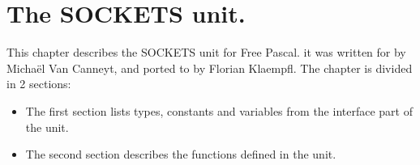 %
%
%
%
%
\chapter{The SOCKETS unit.}
This chapter describes the SOCKETS unit for Free Pascal. 
it was written for \linux by Micha\"el Van Canneyt, and ported to \windows
by Florian Klaempfl.
The chapter is divided in 2 sections:
\begin{itemize}
\item The first section lists types, constants and variables from the
interface part of the unit.
\item The second section describes the functions defined in the unit.
\end{itemize}
